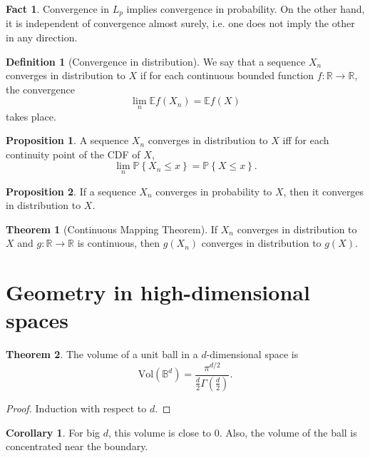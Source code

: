 \documentclass{article}
\theoremstyle{definition}
\newtheorem{theorem}{Theorem}[section]
\newtheorem{definition}{Definition}[section]
\newtheorem{proposition}{Proposition}[section]
\newtheorem{fact}{Fact}[section]
\newtheorem{corollary}{Corollary}[section]
\begin{document}
  \begin{fact}
    Convergence in \( L_{p} \) implies convergence in probability. On
    the other hand, it is independent of convergence almost surely,
    i.e. one does not imply the other in any direction.
  \end{fact}

  \begin{definition}[Convergence in distribution]
    We say that a sequence \( X_{n} \) converges in distribution to \(
    X \) if for each continuous bounded function \( f: \mathbb{R}
    \rightarrow \mathbb{R} \), the convergence
    \[
      \lim_{n} \mathbb{E}f(X_{n}) = \mathbb{E}f(X)
    \]
    takes place.
  \end{definition}

  \begin{proposition}
    A sequence \( X_{n} \) converges in distribution to \( X \) iff for
    each continuity point of the CDF of \( X \),
    \[
      \lim_{n} \mathbb{P}\left\{ X_{n} \leq x \right\} =
      \mathbb{P}\left\{ X \leq x \right\}.
    \]
  \end{proposition}

  \begin{proposition}
    If a sequence \( X_{n} \) converges in probability to \( X \), then
    it converges in distribution to \( X \).
  \end{proposition}

  \begin{theorem}[Continuous Mapping Theorem]
    If \( X_{n} \) converges in distribution to \( X \) and \( g:
    \mathbb{R} \rightarrow \mathbb{R} \) is continuous, then \(
    g(X_{n}) \) converges in distribution to \( g(X) \).
  \end{theorem}

  \section{Geometry in high-dimensional spaces}
  \begin{theorem}
    The volume of a unit ball in a \( d \)-dimensional space is
    \[
      \text{Vol}(\mathbb{B}^d) = \frac{\pi ^{d/2} }{\frac{d}{2} \Gamma
      (\frac{d}{2} )}.
    \]
  \end{theorem}

  \begin{proof}
    Induction with respect to \( d \).
  \end{proof}

  \begin{corollary}
    For big \( d \), this volume is close to \( 0 \).
    Also, the volume of the ball is concentrated near the boundary.
  \end{corollary}
\end{document}
